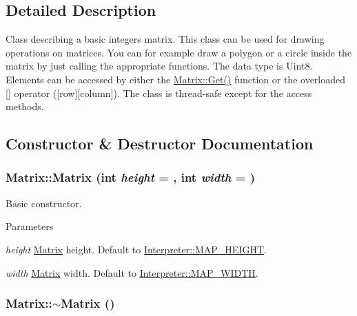 \subsection{Detailed Description}
Class describing a basic integers matrix. This class can be used for drawing operations on matrices. You can for example draw a polygon or a circle inside the matrix by just calling the appropriate functions. The data type is Uint8. Elements can be accessed by either the \hyperlink{classMatrix_a06fc8df480cd88daf69eaa05867cb7bd}{Matrix::Get()} function or the overloaded \mbox{[}\mbox{]} operator (\mbox{[}row\mbox{]}\mbox{[}column\mbox{]}). The class is thread-\/safe except for the access methods. 

\subsection{Constructor \& Destructor Documentation}
\hypertarget{classMatrix_a1cf5bd8134711df6f63e1dbef1912b86}{
\subsubsection[{Matrix}]{\setlength{\rightskip}{0pt plus 5cm}Matrix::Matrix (int {\em height} = {}, \/  int {\em width} = {})}}
\label{classMatrix_a1cf5bd8134711df6f63e1dbef1912b86}


Basic constructor. 


\begin{DoxyParams}{Parameters}
\item[{\em height}]\hyperlink{classMatrix}{Matrix} height. Default to \hyperlink{classInterpreter_abda6b21064d50acd844bda3ed551e263}{Interpreter::MAP\_\-HEIGHT}. \item[{\em width}]\hyperlink{classMatrix}{Matrix} width. Default to \hyperlink{classInterpreter_a30c4dceff341b5e7cd36fdaba21aeaa9}{Interpreter::MAP\_\-WIDTH}. \end{DoxyParams}
\hypertarget{classMatrix_a9b1c3627f573d78a2f08623fdfef990f}{
\subsubsection[{$\sim$Matrix}]{\setlength{\rightskip}{0pt plus 5cm}Matrix::$\sim$Matrix ()}}
\label{classMatrix_a9b1c3627f573d78a2f08623fdfef990f}


